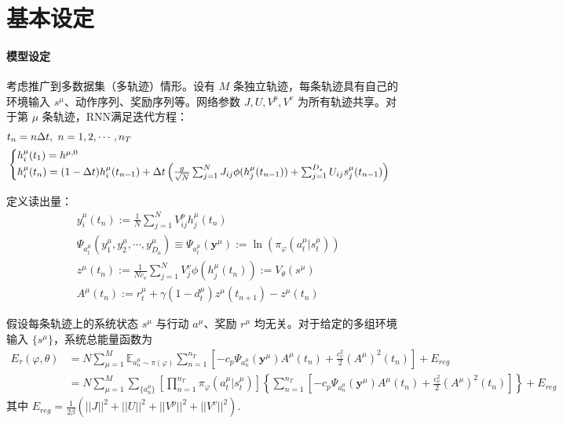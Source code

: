\documentclass[UTF8]{ctexart}
\begin{document}
\section{基本设定}
    \paragraph{模型设定}
    考虑推广到多数据集（多轨迹）情形。设有 $M$ 条独立轨迹，每条轨迹具有自己的环境输入 $s^\mu$、动作序列、奖励序列等。网络参数 $J, U, V^p, V^v$ 为所有轨迹共享。对于第 $\mu$ 条轨迹，RNN满足迭代方程：
    \begin{align}
        &t_n = n \Delta t,\ n = 1, 2, \cdots , n_T \notag\\
        &\begin{cases}
            h_i^\mu (t_1) = h^{\mu,0}\\
            h_i^\mu(t_n) = (1- \Delta t) h_i^\mu(t_{n-1}) + \Delta t \left( \frac{g}{\sqrt{N}} \sum_{j=1}^N J_{ij} \phi(h_j^\mu(t_{n-1})) + \sum_{j = 1}^{D_s} U_{ij} s_j^\mu(t_{n-1})\right)
        \end{cases}
    \end{align}
    
    定义读出量：
    \begin{align}
        &y_i^\mu(t_n) := \frac{1}{N} \sum_{j=1}^N V_{ij}^p h_j^\mu(t_n) \\
        &\Psi_{a_t^\mu}(y_1^\mu, y_2^\mu ,\cdots , y_{D_a}^\mu) \equiv \Psi_{a_t^\mu}(\mathbf{y}^\mu) := \ln(\pi_\varphi(a_t^\mu|s_t^\mu)) \\
        &z^\mu(t_n) := \frac{1}{N c_v} \sum_{j=1}^{N} V_{j}^v \phi(h_j^\mu(t_n)) := V_\theta(s^\mu)\\
        &A^\mu(t_n) := r_t^\mu+\gamma(1-d_t^\mu)z^\mu(t_{n+1}) - z^\mu(t_n)
    \end{align}

    假设每条轨迹上的系统状态 $s^\mu$ 与行动 $a^\mu$、奖励 $r^\mu$ 均无关。对于给定的多组环境输入 $\{s^\mu\}$，系统总能量函数为
    \begin{equation}
    \begin{aligned}
         E_\tau(\varphi,\theta) &= N \sum_{\mu=1}^M \mathbb{E}_{a_n^\mu \sim \pi(\varphi)} \sum_{n=1}^{n_T} \left[  - c_p \Psi_{a_n^\mu}(\mathbf{y}^\mu) A^\mu(t_n) + \frac{c_v^2}{2} (A^\mu)^2(t_n) \right] + E_{reg} \\
         &= N \sum_{\mu=1}^M\sum_{\{a_n^\mu\}} \left[ \prod_{n=1}^{n_T} \pi_\varphi(a_t^\mu |s_t^\mu) \right] \left\{ \sum_{n=1}^{n_T} \left[  - c_p \Psi_{a_n^\mu}(\mathbf{y}^\mu) A^\mu(t_n) + \frac{c_v^2}{2} (A^\mu)^2(t_n) \right] \right\} + E_{reg}
    \end{aligned}
    \end{equation}
    其中 $E_{reg} = \frac{1}{2 \beta }\left( ||J||^2 + ||U||^2 + ||V^p||^2 + ||V^v||^2 \right)$.
\end{document}
